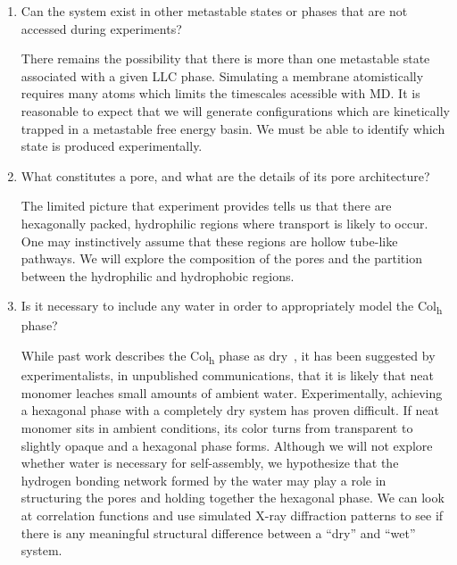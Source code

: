 \documentclass[journal=jpcbfk,manusciprt=article]{achemso}
\begin{document}
\begin{enumerate}
  \item Can the system exist in other metastable states or phases that are not
  accessed during experiments? \label{point:metastable}
  
  There remains the possibility that there is more than one metastable state
  associated with a given LLC phase. Simulating a membrane atomistically
  requires many atoms which limits the timescales acessible with MD. It is
  reasonable to expect that we will generate configurations which are kinetically
  trapped in a metastable free energy basin. We must be able to identify which
  state is produced experimentally.

  \item What constitutes a pore, and what are the details of its pore architecture? \label{point:poredefinition}

  The limited picture that experiment provides tells us that there are
  hexagonally packed, hydrophilic regions where transport is likely to occur.
  One may instinctively assume that these regions are hollow tube-like pathways.
  We will explore the composition of the pores and the partition between the
  hydrophilic and hydrophobic regions. 

  \item Is it necessary to include any water in order to appropriately model
  the Col\textsubscript{h} phase? \label{point:water}

  While past work describes the Col\textsubscript{h} phase as dry~\cite{feng_scalable_2014}, 
  it has been suggested by experimentalists, in
  unpublished communications, that it is likely that neat monomer leaches small
  amounts of ambient water. Experimentally, achieving a hexagonal phase with a
  completely dry system has proven difficult. If neat monomer sits in ambient
  conditions, its color turns from transparent to slightly opaque and a hexagonal
  phase forms. Although we will not explore whether water is necessary for
  self-assembly, we hypothesize that the hydrogen bonding network formed by the
  water may play a role in structuring the pores and holding together the
  hexagonal phase. We can look at correlation functions and use simulated X-ray
  diffraction patterns to see if there is any meaningful structural difference
  between a ``dry'' and ``wet'' system.

  \end{enumerate}
  
 
\end{document}
